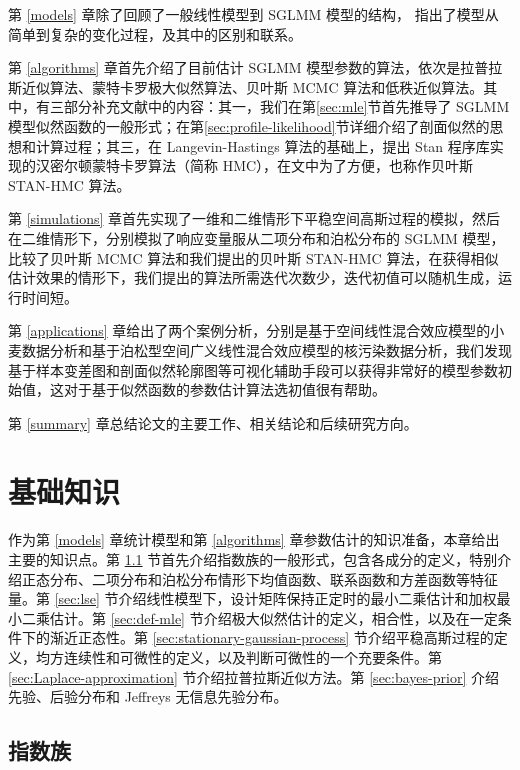 \documentclass[12pt,a4paper,UTF8,twoside]{book}
\theoremstyle{definition}
\theoremstyle{definition}
\theoremstyle{definition}
\theoremstyle{remark}
\begin{document}
第 \ref{models} 章除了回顾了一般线性模型到 SGLMM 模型的结构，
指出了模型从简单到复杂的变化过程，及其中的区别和联系。

第 \ref{algorithms} 章首先介绍了目前估计 SGLMM
模型参数的算法，依次是拉普拉斯近似算法、蒙特卡罗极大似然算法、贝叶斯
MCMC
算法和低秩近似算法。其中，有三部分补充文献中的内容：其一，我们在第\ref{sec:mle}节首先推导了
SGLMM
模型似然函数的一般形式；在第\ref{sec:profile-likelihood}节详细介绍了剖面似然的思想和计算过程；其三，在
Langevin-Hastings 算法的基础上，提出 Stan
程序库实现的汉密尔顿蒙特卡罗算法（简称
HMC），在文中为了方便，也称作贝叶斯 STAN-HMC 算法。

第 \ref{simulations}
章首先实现了一维和二维情形下平稳空间高斯过程的模拟，然后在二维情形下，分别模拟了响应变量服从二项分布和泊松分布的
SGLMM 模型，比较了贝叶斯 MCMC 算法和我们提出的贝叶斯 STAN-HMC
算法，在获得相似估计效果的情形下，我们提出的算法所需迭代次数少，迭代初值可以随机生成，运行时间短。

第 \ref{applications}
章给出了两个案例分析，分别是基于空间线性混合效应模型的小麦数据分析和基于泊松型空间广义线性混合效应模型的核污染数据分析，我们发现基于样本变差图和剖面似然轮廓图等可视化辅助手段可以获得非常好的模型参数初始值，这对于基于似然函数的参数估计算法选初值很有帮助。

第 \ref{summary} 章总结论文的主要工作、相关结论和后续研究方向。

\hypertarget{prepare}{%
\chapter{基础知识}\label{prepare}}

作为第 \ref{models} 章统计模型和第 \ref{algorithms}
章参数估计的知识准备，本章给出主要的知识点。第 \ref{sec:exp}
节首先介绍指数族的一般形式，包含各成分的定义，特别介绍正态分布、二项分布和泊松分布情形下均值函数、联系函数和方差函数等特征量。第
\ref{sec:lse}
节介绍线性模型下，设计矩阵保持正定时的最小二乘估计和加权最小二乘估计。第
\ref{sec:def-mle}
节介绍极大似然估计的定义，相合性，以及在一定条件下的渐近正态性。第
\ref{sec:stationary-gaussian-process}
节介绍平稳高斯过程的定义，均方连续性和可微性的定义，以及判断可微性的一个充要条件。第
\ref{sec:Laplace-approximation} 节介绍拉普拉斯近似方法。第
\ref{sec:bayes-prior} 介绍先验、后验分布和 Jeffreys 无信息先验分布。

\hypertarget{sec:exp}{%
\section{指数族}\label{sec:exp}}
\end{document}
